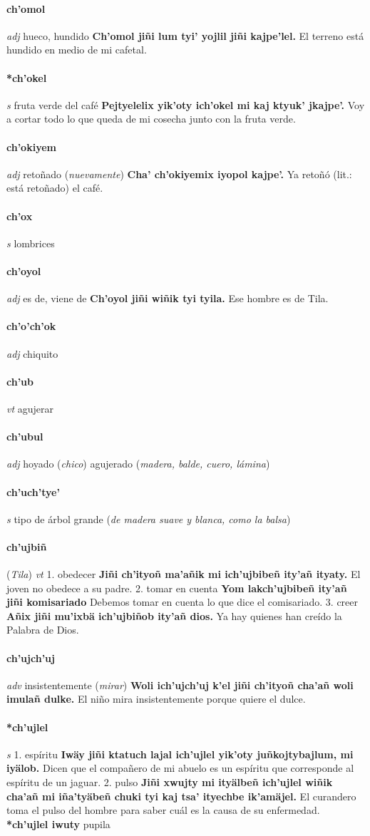 \documentclass{scrbook}
\newcommand{\entry}[1]{\paragraph{#1}}
\newcommand{\onedefinition}[1]{#1.}
\newcommand{\partofspeech}[1]{\textit{#1}}
\newcommand{\spanishtranslation}[1]{#1}
\newcommand{\clarification}[1]{(\textit{#1})}
\newcommand{\cholexample}[1]{\textbf{#1}}
\newcommand{\exampletranslation}[1]{#1}
\newcommand{\relevantdialect}[1]{(\textit{#1})}
\newcommand{\secondaryentry}[1]{\\\textbf{#1}}
\newcommand{\secondtranslation}[1]{#1}
\begin{document}
\begin{multicols}{2}
\entry{ch'omol}
\partofspeech{adj}
\spanishtranslation{hueco, hundido}
\cholexample{Ch'omol jiñi lum tyi' yojlil jiñi kajpe'lel.}
\exampletranslation{El terreno está hundido en medio de mi cafetal.}

\entry{*ch'okel}
\partofspeech{s}
\spanishtranslation{fruta verde del café}
\cholexample{Pejtyelelix yik'oty ich'okel mi kaj ktyuk' jkajpe'.}
\exampletranslation{Voy a cortar todo lo que queda de mi cosecha junto con la fruta verde.}

\entry{ch'okiyem}
\partofspeech{adj}
\spanishtranslation{retoñado}
\clarification{nuevamente}
\cholexample{Cha' ch'okiyemix iyopol kajpe'.}
\exampletranslation{Ya retoñó (lit.: está retoñado) el café.}

\entry{ch'ox}
\partofspeech{s}
\spanishtranslation{lombrices}

\entry{ch'oyol}
\partofspeech{adj}
\spanishtranslation{es de, viene de}
\cholexample{Ch'oyol jiñi wiñik tyi tyila.}
\exampletranslation{Ese hombre es de Tila.}

\entry{ch'o'ch'ok}
\partofspeech{adj}
\spanishtranslation{chiquito}

\entry{ch'ub}
\partofspeech{vt}
\spanishtranslation{agujerar}

\entry{ch'ubul}
\partofspeech{adj}
\spanishtranslation{hoyado}
\clarification{chico}
\spanishtranslation{agujerado}
\clarification{madera, balde, cuero, lámina}

\entry{ch'uch'tye'}
\partofspeech{s}
\spanishtranslation{tipo de árbol grande}
\clarification{de madera suave y blanca, como la balsa}

\entry{ch'ujbiñ}
\relevantdialect{Tila}
\partofspeech{vt}
\onedefinition{1}
\spanishtranslation{obedecer}
\cholexample{Jiñi ch'ityoñ ma'añik mi ich'ujbibeñ ity'añ ityaty.}
\exampletranslation{El joven no obedece a su padre.}
\onedefinition{2}
\spanishtranslation{tomar en cuenta}
\cholexample{Yom lakch'ujbibeñ ity'añ jiñi komisariado}
\exampletranslation{Debemos tomar en cuenta lo que dice el comisariado.}
\onedefinition{3}
\spanishtranslation{creer}
\cholexample{Añix jiñi mu'ixbä ich'ujbiñob ity'añ dios.}
\exampletranslation{Ya hay quienes han creído la Palabra de Dios.}

\entry{ch'ujch'uj}
\partofspeech{adv}
\spanishtranslation{insistentemente}
\clarification{mirar}
\cholexample{Woli ich'ujch'uj k'el jiñi ch'ityoñ cha'añ woli imulañ dulke.}
\exampletranslation{El niño mira insistentemente porque quiere el dulce.}

\entry{*ch'ujlel}
\partofspeech{s}
\onedefinition{1}
\spanishtranslation{espíritu}
\cholexample{Iwäy jiñi ktatuch lajal ich'ujlel yik'oty juñkojtybajlum, mi iyälob.}
\exampletranslation{Dicen que el compañero de mi abuelo es un espíritu que corresponde al espíritu de un jaguar.}
\onedefinition{2}
\spanishtranslation{pulso}
\cholexample{Jiñi xwujty mi ityälbeñ ich'ujlel wiñik cha'añ mi iña'tyäbeñ chuki tyi kaj tsa' ityechbe ik'amäjel.}
\exampletranslation{El curandero toma el pulso del hombre para saber cuál es la causa de su enfermedad.}
\secondaryentry{*ch'ujlel iwuty}
\secondtranslation{pupila}


\end{multicols}
\end{document}
